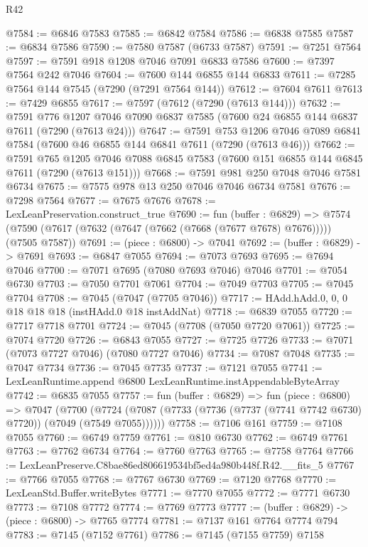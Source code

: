\begin{lexlean}{R42}
\begin{coremodule}
{@7584 := @6846 @7583
@7585 := @6842 @7584
@7586 := @6838 @7585
@7587 := @6834 @7586
@7590 := @7580 @7587 (@6733 @7587)
@7591 := @7251 @7564
@7597 := @7591 @918 @1208 @7046 @7091 @6833 @7586
@7600 := @7397 @7564 @242 @7046
@7604 := @7600 @144 @6855 @144 @6833
@7611 := @7285 @7564 @144 @7545 (@7290 (@7291 @7564 @144))
@7612 := @7604 @7611
@7613 := @7429 @6855
@7617 := @7597 (@7612 (@7290 (@7613 @144)))
@7632 := @7591
    @776
    @1207
    @7046
    @7090
    @6837
    @7585
    (@7600 @24 @6855 @144 @6837 @7611 (@7290 (@7613 @24)))
@7647 := @7591
    @753
    @1206
    @7046
    @7089
    @6841
    @7584
    (@7600 @46 @6855 @144 @6841 @7611 (@7290 (@7613 @46)))
@7662 := @7591
    @765
    @1205
    @7046
    @7088
    @6845
    @7583
    (@7600 @151 @6855 @144 @6845 @7611 (@7290 (@7613 @151)))
@7668 := @7591 @981 @250 @7048 @7046 @7581 @6734
@7675 := @7575 @978 @13 @250 @7046 @7046 @6734 @7581
@7676 := @7298 @7564
@7677 := @7675 @7676
@7678 := LexLeanPreservation.construct_true
@7690 := fun (buffer : @6829) =>
  @7574 (@7590 (@7617 (@7632 (@7647 (@7662 (@7668 (@7677 @7678) @7676))))) (@7505 @7587))
@7691 := (piece : @6800) -> @7041
@7692 := (buffer : @6829) -> @7691
@7693 := @6847 @7055
@7694 := @7073 @7693
@7695 := @7694 @7046
@7700 := @7071 @7695 (@7080 @7693 @7046) @7046
@7701 := @7054 @6730
@7703 := @7050 @7701 @7061
@7704 := @7049 @7703
@7705 := @7045 @7704
@7708 := @7045 (@7047 (@7705 @7046))
@7717 := HAdd.hAdd.{0, 0, 0} @18 @18 @18 (instHAdd.{0} @18 instAddNat)
@7718 := @6839 @7055
@7720 := @7717 @7718 @7701
@7724 := @7045 (@7708 (@7050 @7720 @7061))
@7725 := @7074 @7720
@7726 := @6843 @7055
@7727 := @7725 @7726
@7733 := @7071 (@7073 @7727 @7046) (@7080 @7727 @7046)
@7734 := @7087 @7048
@7735 := @7047 @7734
@7736 := @7045 @7735
@7737 := @7121 @7055
@7741 := LexLeanRuntime.append @6800 LexLeanRuntime.instAppendableByteArray
@7742 := @6835 @7055
@7757 := fun (buffer : @6829) =>
  fun (piece : @6800) =>
  @7047
    (@7700 (@7724 (@7087 (@7733 (@7736 (@7737 (@7741 @7742 @6730) @7720)) (@7049 (@7549 @7055))))))
@7758 := @7106 @161
@7759 := @7108 @7055
@7760 := @6749 @7759
@7761 := @810 @6730
@7762 := @6749 @7761
@7763 := @7762 @6734
@7764 := @7760 @7763
@7765 := @7758 @7764
@7766 := LexLeanPreserve.C8bae86ed806619534bf5ed4a980b448f.R42.__fits_5
@7767 := @7766 @7055
@7768 := @7767 @6730
@7769 := @7120 @7768
@7770 := LexLeanStd.Buffer.writeBytes
@7771 := @7770 @7055
@7772 := @7771 @6730
@7773 := @7108 @7772
@7774 := @7769 @7773
@7777 := (buffer : @6829) -> (piece : @6800) -> @7765 @7774
@7781 := @7137 @161 @7764 @7774 @794
@7783 := @7145 (@7152 @7761)
@7786 := @7145 (@7155 @7759) @7158
}
\end{coremodule}
\end{lexlean}
